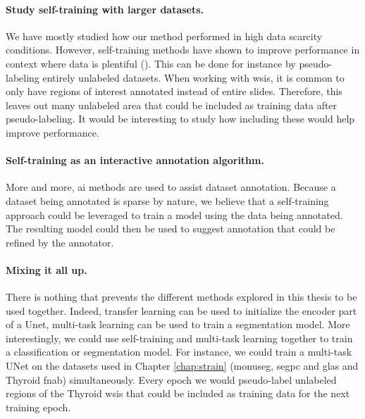 \paragraph{Study self-training with larger datasets.} We have mostly studied how our method performed in high data scarcity conditions. However, self-training methods have shown to improve performance in context where data is plentiful (\eg \cite{zoph2020rethinking}). This can be done for instance by pseudo-labeling entirely unlabeled datasets. When working with \acrlong{wsi}s, it is common to only have regions of interest annotated instead of entire slides. Therefore, this leaves out many unlabeled area that could be included as training data after pseudo-labeling. It would be interesting to study how including these would help improve performance. 

\paragraph{Self-training as an interactive annotation algorithm.} More and more, \acrlong{ai} methods are used to assist dataset annotation. Because a dataset being annotated is sparse by nature, we believe that a self-training approach could be leveraged to train a model using the data being annotated. The resulting model could then be used to suggest annotation that could be refined by the annotator.   

\paragraph{Mixing it all up.} There is nothing that prevents the different methods explored in this thesis to be used together. Indeed, transfer learning can be used to initialize the encoder part of a Unet, multi-task learning can be used to train a segmentation model. More interestingly, we could use self-training and multi-task learning together to train a classification or segmentation model. For instance, we could train a multi-task UNet on the datasets used in Chapter \ref{chap:strain} (\acrshort{monuseg}, \acrshort{segpc} and \acrshort{glas} and Thyroid \acrshort{fnab}) simultaneously. Every epoch we would pseudo-label unlabeled regions of the Thyroid \acrlong{wsi}s that could be included as training data for the next training epoch.






